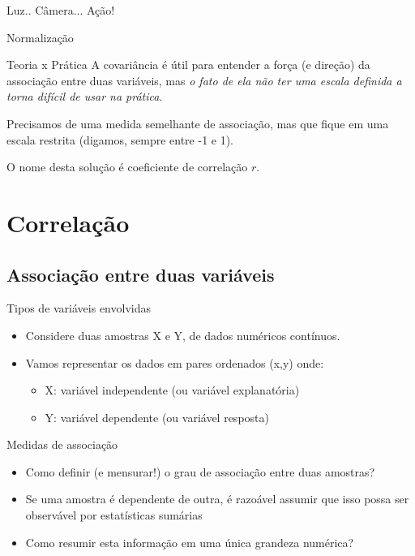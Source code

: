 \documentclass{beamer}
\begin{document}
\begin{frame}{Luz.. Câmera... Ação!}
  \begin{center}
  \end{center}
\end{frame}

\begin{frame}{Normalização}
  \begin{block}{Teoria x Prática}
    A covariância é útil para entender a força (e direção) da associação entre duas variáveis, mas {\em o fato de ela não ter uma escala definida a torna difícil de usar na prática}.

    \bigskip
    Precisamos de uma medida semelhante de associação, mas que fique em uma escala restrita (digamos, sempre entre -1 e 1).
  \end{block}

  \bigskip
  O nome desta solução é \alert{coeficiente de correlação} $r$.
  
\end{frame}


\section{Correlação}

\subsection[Associação]{Associação entre duas variáveis}

\begin{frame}{Tipos de variáveis envolvidas}
  \begin{itemize}
  \item Considere duas amostras X e Y, de dados numéricos contínuos.
  \item Vamos representar os dados em pares ordenados (x,y) onde:
    \begin{itemize}
    \item X: variável independente (ou variável explanatória)
    \item Y: variável dependente (ou variável resposta)
    \end{itemize}
  \end{itemize}
\end{frame}

\begin{frame}{Medidas de associação}
  \begin{itemize}
  \item Como definir (e mensurar!) o grau de associação entre duas amostras?
  \item Se uma amostra é dependente de outra, é razoável assumir que isso
    possa ser observável por estatísticas sumárias
  \item Como resumir esta informação em uma única grandeza numérica?
  \end{itemize}
\end{frame}
\end{document}

